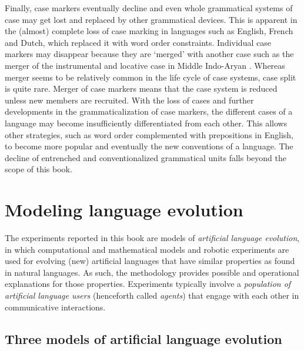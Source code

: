 Finally, case markers eventually decline and even whole grammatical systems of case may get lost and replaced by other grammatical devices. This is apparent in the (almost) complete loss of case marking in languages such as English, French and Dutch, which replaced it with word order constraints. Individual case markers may disappear because they are `merged' with another case such as the merger of the instrumental and locative case in Middle Indo-Aryan \citep[176]{blake94case}. Whereas merger seems to be relatively common in the life cycle of case systems, case split is quite rare. Merger of case markers means that the case system is reduced unless new members are recruited. With the loss of cases and further developments in the grammaticalization of case markers, the different cases of a language may become insufficiently differentiated from each other. This allows other strategies, such as word order complemented with prepositions in English, to become more popular and eventually the new conventions of a language. The decline of entrenched and conventionalized grammatical units falls beyond the scope of this book.

\section{Modeling language evolution}
\label{s:models}

The experiments reported in this book are models of {\em artificial language evolution}, in which computational and mathematical models and robotic experiments are used for evolving (new) artificial languages that have similar properties as found in natural languages. As such, the methodology provides possible and operational explanations for those properties. Experiments typically involve a {\em population of artificial language users} (henceforth called {\em agents}) that engage with each other in communicative interactions. 

\subsection{Three models of artificial language evolution}

